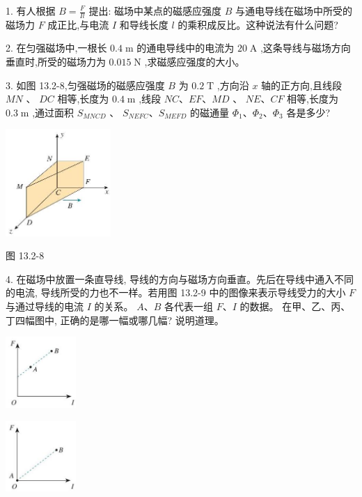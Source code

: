 \documentclass[10pt]{article}
\begin{document}
1. 有人根据 \(B = \frac{F}{Il}\) 提出: 磁场中某点的磁感应强度 \(B\) 与通电导线在磁场中所受的磁场力 \(F\) 成正比,与电流 \(I\) 和导线长度 \(l\) 的乘积成反比。这种说法有什么问题?

2. 在匀强磁场中,一根长 \({0.4}\mathrm{\;m}\) 的通电导线中的电流为 \({20}\mathrm{\;A}\) ,这条导线与磁场方向垂直时,所受的磁场力为 \({0.015}\mathrm{\;N}\) ,求磁感应强度的大小。

3. 如图 13.2-8,匀强磁场的磁感应强度 \(B\) 为 \({0.2}\mathrm{\;T}\) ,方向沿 \(x\) 轴的正方向,且线段 \({MN}\) 、 \({DC}\) 相等,长度为 \({0.4}\mathrm{\;m}\) ,线段 \({NC}\text{、}{EF}\text{、}{MD}\) 、 \({NE}\text{、}{CF}\) 相等,长度为 \({0.3}\mathrm{\;m}\) ,通过面积 \({S}_{MNCD}\) 、 \({S}_{NEFC}\text{、}{S}_{MEFD}\) 的磁通量 \({\Phi }_{1}\text{、}{\Phi }_{2}\text{、}{\Phi }_{3}\) 各是多少?

\begin{center}
\includegraphics[max width=0.3\textwidth]{images/01911d5f-8e38-70c0-b5b8-2b399bd115b6_118_827842.jpg}
\end{center}

图 13.2-8

4. 在磁场中放置一条直导线, 导线的方向与磁场方向垂直。先后在导线中通入不同的电流, 导线所受的力也不一样。若用图 13.2-9 中的图像来表示导线受力的大小 \(F\) 与通过导线的电流 \(I\) 的关系。 \(A\text{、}B\) 各代表一组 \(F\text{、}I\) 的数据。 在甲、乙、丙、丁四幅图中, 正确的是哪一幅或哪几幅? 说明道理。

\begin{center}
\includegraphics[max width=0.2\textwidth]{images/01911d5f-8e38-70c0-b5b8-2b399bd115b6_118_127077.jpg}
\end{center}

\begin{center}
\includegraphics[max width=0.2\textwidth]{images/01911d5f-8e38-70c0-b5b8-2b399bd115b6_118_722476.jpg}
\end{center}
\end{document}
